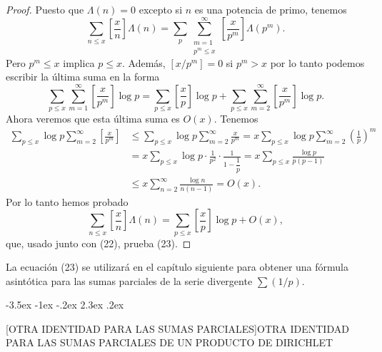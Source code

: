 \documentclass[12pt,a4paper]{book}
\makeatletter
\renewcommand\section{\@startsection{section}{1}{\z@}%
  {-3.5ex \@plus -1ex \@minus -.2ex}%
  {2.3ex \@plus .2ex}%
  {\normalfont\Large\bfseries\raggedright}}
\makeatother
\begin{document}
    \begin{proof}
        Puesto que $\Lambda(n)=0$ excepto si $n$ es una potencia de primo, tenemos
        \begin{equation*}
            \sum_{n\leq x}\left[\frac{x}{n}\right]\Lambda(n)
            =\sum_{p}\sum_{\substack{m=1\\ p^{m}\leq x}}^{\infty}\left[\frac{x}{p^{m}}\right]\Lambda(p^{m}).
        \end{equation*}
        Pero $p^{m}\leq x$ implica $p\leq x$. Además, $[x/p^{m}]=0$ si $p^{m}>x$ por lo tanto
        podemos escribir la última suma en la forma
        \begin{equation*}
            \sum_{p\leq x}\sum_{m=1}^{\infty}\left[\frac{x}{p^{m}}\right]\log p
            =\sum_{p\leq x}\left[\frac{x}{p}\right]\log p
            +\sum_{p\leq x}\sum_{m=2}^{\infty}\left[\frac{x}{p^{m}}\right]\log p.
        \end{equation*}
        Ahora veremos que esta última suma es $O(x)$. Tenemos
        \begin{align*}
            \sum_{p\leq x}\log p\sum_{m=2}^{\infty}\left[\frac{x}{p^{m}}\right]
            &\leq\sum_{p\leq x}\log p\sum_{m=2}^{\infty}\frac{x}{p^{m}}
            =x\sum_{p\leq x}\log p\sum_{m=2}^{\infty}\left(\frac{1}{p}\right)^{m}\\
            &=x\sum_{p\leq x}\log p\cdot\frac{1}{p^{2}}\cdot\frac{1}{1-\dfrac{1}{p}}
            =x\sum_{p\leq x}\frac{\log p}{p(p-1)}\\
            &\leq x\sum_{n=2}^{\infty}\frac{\log n}{n(n-1)}=O(x).
        \end{align*}
        Por lo tanto hemos probado
        \begin{equation*}
            \sum_{n\leq x}\left[\frac{x}{n}\right]\Lambda(n)=\sum_{p\leq x}\left[\frac{x}{p}\right]\log p+O(x),
        \end{equation*}
        que, usado junto con (22), prueba (23).
    \end{proof}

    La ecuación (23) se utilizará en el capítulo siguiente para obtener una fórmula
    asintótica para las sumas parciales de la serie divergente $\sum(1/p)$.

    \section[OTRA IDENTIDAD PARA LAS SUMAS PARCIALES]{OTRA IDENTIDAD PARA LAS SUMAS PARCIALES DE UN PRODUCTO DE DIRICHLET}
\end{document}
